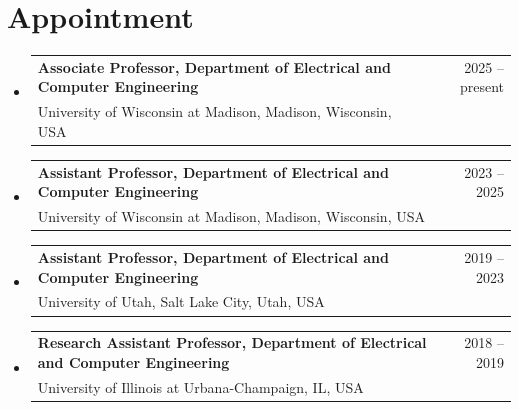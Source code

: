 \documentclass[A4,11pt]{article}
\makeatletter
\newcommand{\CVItem}[1]{
  \item\small{
    {#1 \vspace{-2pt}}
  }
}
\newcommand{\CVSubheading}[4]{
  \vspace{-2pt}\item
    \begin{tabular*}{0.97\textwidth}[t]{l@{\extracolsep{\fill}}r}
      \textbf{#1} & #2 \\
      \small#3 & \small #4 \\
    \end{tabular*}\vspace{-7pt}
}
\newcommand{\CVSubHeadingListStart}{\begin{itemize}[leftmargin=0.5cm, label={}]}
\newcommand{\CVSubHeadingListEnd}{\end{itemize}}
\newcommand{\CVItemListStart}{\begin{itemize}}
\newcommand{\CVItemListEnd}{\end{itemize}\vspace{-5pt}}
\makeatother
\begin{document}

\section{Appointment}
  \CVSubHeadingListStart
    \CVSubheading
      {{Associate Professor, Department of Electrical and Computer Engineering}}{2025 -- present}
      {University of Wisconsin at Madison, Madison, Wisconsin, USA}{}
    \CVSubheading
      {{Assistant Professor, Department of Electrical and Computer Engineering}}{2023 -- 2025}
      {University of Wisconsin at Madison, Madison, Wisconsin, USA}{}
    \CVSubheading
      {{Assistant Professor, Department of Electrical and Computer Engineering}}{2019 -- 2023}
      {University of Utah, Salt Lake City, Utah, USA}{}
    \CVSubheading
      {{Research Assistant Professor, Department of Electrical and Computer Engineering}}{2018 -- 2019}
      {University of Illinois at Urbana-Champaign, IL, USA}{}
  \CVSubHeadingListEnd
\end{document}

